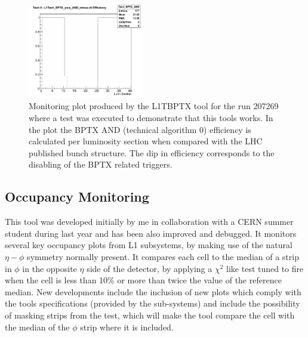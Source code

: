 \begin{figure}[!htb]
\centering
\includegraphics[width=0.45\textwidth]{Chapter03/L1TOnline/Images/L1TBPTX_Tech_BPTX_AND.png}
\caption{Monitoring plot produced by the L1TBPTX tool for the run 207269 where a test was executed to demonstrate that 
this tools works. In the plot the BPTX AND (technical algorithm 0) efficiency is calculated per luminosity section 
when compared with the LHC published bunch structure. The dip in efficiency corresponds to the disabling of the BPTX 
related triggers.} 
\label{FIGURE:TechnicalWork_L1TBPTX_ImplementationTests}
\end{figure}

\subsection{Occupancy Monitoring}


This tool was developed initially by me in collaboration with a CERN summer student during last year and has been
also improved and debugged. It monitors several key occupancy plots from L1 subsystems, by making use of the natural
$\eta-\phi$ symmetry normally present. It compares each cell to the median of a strip in $\phi$ in the opposite $\eta$
side of the detector, by applying a $\chi^{2}$ like test tuned to fire when the cell is less than 10\% or more than
twice the value of the reference median. New developments include the inclusion of new plots which comply with the
tools specifications (provided by the sub-systems) and include the possibility of masking strips from the test, which 
will make the tool compare the cell with the median of the $\phi$ strip where it is included.

